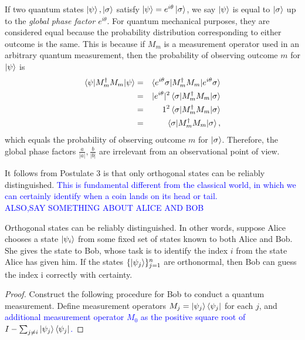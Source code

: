 {If two quantum states $\ket{\psi}, \ket{\sigma}$ satisfy $\ket{\psi}=e^{i\theta}\ket{\sigma}$, we say $\ket{\psi}$ is equal to $\ket{\sigma}$ up to the \textit{global phase factor $e^{i\theta}$}. For quantum mechanical purposes, they are considered equal because the probability distribution corresponding to either outcome is the same. This is because if $M_m$ is a measurement operator used in an arbitrary quantum measurement, then the probability of observing outcome $m$ for $\ket{\psi}$ is 
\begin{eqnarray}
\braket{\psi|M_m^\dagger M_m|\psi} &=& \braket{e^{i\theta}\sigma|M_m^\dagger M_m|e^{i\theta} \sigma} \\
&=& |e^{i\theta}|^2\braket{\sigma|M_m^\dagger M_m| \sigma} \\
&=& 1^2\braket{\sigma|M_m^\dagger M_m| \sigma} \\
&=& \braket{\sigma|M_m^\dagger M_m| \sigma} ,
\end{eqnarray}
which equals the probability of observing outcome $m$ for $\ket{\sigma}$.  Therefore, the global phase factors $\frac{a}{|a|}, \frac{b}{|b|}$ are irrelevant from an observational point of view.

\bigskip
It follows from Postulate 3 is that only orthogonal states can be reliably distinguished. \textcolor{blue}{This is fundamental different from the classical world, in which we can certainly identify when a coin lands on its head or tail. \\ALSO,SAY SOMETHING ABOUT ALICE AND BOB}

\begin{theorem} \label{theorem-distinguishing orthogonal states}
Orthogonal states can be reliably distinguished. In other words, suppose Alice chooses a state $\ket{\psi_i}$ from some fixed set of states known to both Alice and Bob. She gives the state to Bob, whose task is to identify the index $i$ from the state Alice has given him. If the states $\{\ket{\psi_j}\}_{j=1}^n$ are orthonormal, then Bob can guess the index i correctly with certainty.
\end{theorem}
\begin{proof}
Construct the following procedure for Bob to conduct a quantum measurement.
Define measurement operators $M_j=\ket{\psi_j}\bra{\psi_j}$ for each $j$, and \textcolor{blue}{additional measurement operator $M_0$ as the positive square root of $I-\sum_{j \ne i} \ket{\psi_j}\bra{\psi_j}$.}


\end{proof}}
